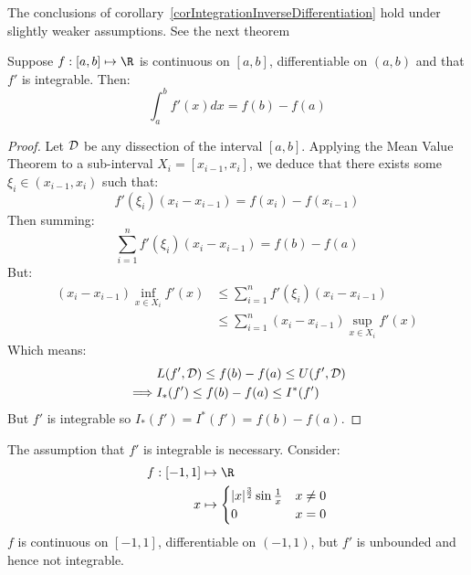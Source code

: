 \documentclass[../Main.tex]{subfiles}
\begin{document}
\begin{remark}
    The conclusions of corollary~\ref{corIntegrationInverseDifferentiation} hold under slightly weaker assumptions. See the next theorem
\end{remark}
\begin{theorem}
    Suppose $f : [a, b] \mapsto \R$ is continuous on $[a, b]$, differentiable on $(a, b)$ and that $f'$ is integrable. Then:
    \begin{equation*}
        \int_a^b f'(x) dx = f(b) - f(a)
    \end{equation*}
    \label{thmFundamentalCalculusII}
\end{theorem}
\begin{proof}
    Let $\mathcal{D}$ be any dissection of the interval $[a, b]$. Applying the Mean Value Theorem to a sub-interval $X_i = [x_{i - 1}, x_i]$, we deduce that there exists some $\xi_i \in (x_{i - 1}, x_i)$ such that:
    \begin{equation*}
        f'(\xi_i)(x_i - x_{i - 1}) = f(x_i) - f(x_{i - 1})
    \end{equation*}
    Then summing:
    \begin{equation*}
        \sum_{i = 1}^n f'(\xi_i)(x_i - x_{i - 1}) = f(b) - f(a)
    \end{equation*}
    But:
    \begin{align*}
        (x_i - x_{i - 1}) \inf_{x \in X_i} f'(x) &\leq \sum_{i = 1}^n f'(\xi_i) (x_i - x_{i - 1}) \\
        &\leq \sum_{i = 1}^n (x_i - x_{i - 1}) \sup_{x \in X_i} f'(x)
    \end{align*}
    Which means:
    \begin{align*}
        &L(f', \mathcal{D}) \leq f(b) - f(a) \leq U(f', \mathcal{D}) \\
        \implies &I_*(f') \leq f(b) - f(a) \leq I^*(f')
    \end{align*}
    But $f'$ is integrable so $I_*(f') = I^*(f') = f(b) - f(a)$.
\end{proof}
\begin{remark}
    The assumption that $f'$ is integrable is necessary. Consider:
    \begin{align*}
        f: [-1, 1] &\mapsto \R \\
        x &\mapsto
        \begin{cases}
            |x|^{\frac{3}{2}} \sin\frac{1}{x} & x \neq 0 \\
            0 & x = 0
        \end{cases}
    \end{align*}
    $f$ is continuous on $[-1, 1]$, differentiable on $(-1, 1)$, but $f'$ is unbounded and hence not integrable.
\end{remark}
\end{document}
